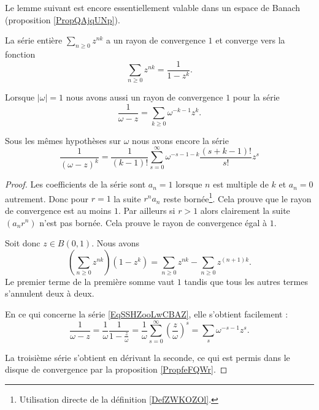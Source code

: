Le lemme suivant est encore essentiellement valable dans un espace de Banach (proposition \ref{PropQAjqUNp}).
\begin{lemma}       \label{LemPQFDooGUPBvF}
    La série entière \( \sum_{n\geq 0}z^{nk}\) a un rayon de convergence \( 1\) et converge vers la fonction
    \begin{equation}
        \sum_{n\geq 0}z^{nk}=\frac{1}{ 1-z^k }.
    \end{equation}

    Lorsque \( | \omega |=1\) nous avons aussi un rayon de convergence \( 1\) pour la série
    \begin{equation}        \label{EqSSHZooLwCBAZ}
        \frac{1}{ \omega-z }=\sum_{k\geq 0}\omega^{-k-1}z^k.
    \end{equation}

    Sous les mêmes hypothèses sur \( \omega\) nous avons encore la série
    \begin{equation}
        \frac{1}{ (\omega-z)^k }=\frac{1}{ (k-1)! }\sum_{s=0}^{\infty}\omega^{-s-1-k}\frac{ (s+k-1)! }{ s! }z^s
    \end{equation}
    
\end{lemma}

\begin{proof}
    Les coefficients de la série sont \( a_n=1\) lorsque \( n\) est multiple de \( k\) et \( a_n=0\) autrement. Donc pour \( r=1\) la suite \( r^na_n\) reste bornée\footnote{Utilisation directe de la définition \ref{DefZWKOZOl}.}. Cela prouve que le rayon de convergence est au moins \( 1\). Par ailleurs si \( r>1\) alors clairement la suite \( (a_nr^n)\) n'est pas bornée. Cela prouve le rayon de convergence égal à \( 1\).

    Soit donc \( z\in B(0,1)\). Nous avons
    \begin{equation}
        \left( \sum_{n\geq 0}z^{nk} \right)(1-z^k)=\sum_{n\geq 0}z^{nk}-\sum_{n\geq 0}z^{(n+1)k}.
    \end{equation}
    Le premier terme de la première somme vaut \( 1\) tandis que tous les autres termes s'annulent deux à deux.

    En ce qui concerne la série \eqref{EqSSHZooLwCBAZ}, elle s'obtient facilement :
    \begin{equation}
        \frac{1}{ \omega-z }=\frac{1}{  \omega }\frac{1}{ 1-\frac{ z }{ \omega } }=\frac{1}{ \omega }\sum_{s=0}^{\infty}\left( \frac{ z }{ \omega } \right)^s=\sum_s\omega^{-s-1}z^s.
    \end{equation}
    
    La troisième série s'obtient en dérivant la seconde, ce qui est permis dans le disque de convergence par la proposition \ref{PropfeFQWr}.
\end{proof}

